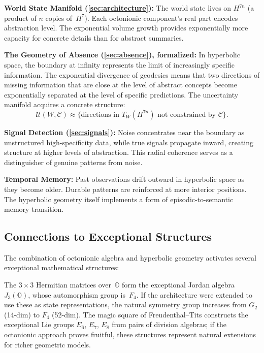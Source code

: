 \documentclass[11pt,a4paper]{article}
\newcommand{\Oct}{\mathbb{O}}
\begin{document}
\textbf{World State Manifold (\cref{sec:architecture}):} The world state lives on $H^{7n}$ (a product of $n$ copies of~$H^7$). Each octonionic component's real part encodes abstraction level. The exponential volume growth provides exponentially more capacity for concrete details than for abstract summaries.

\textbf{The Geometry of Absence (\cref{sec:absence}), formalized:} In hyperbolic space, the boundary at infinity represents the limit of increasingly specific information. The exponential divergence of geodesics means that two directions of missing information that are close at the level of abstract concepts become exponentially separated at the level of specific predictions. The uncertainty manifold acquires a concrete structure:
\begin{equation}
\mathcal{U}(W, \mathcal{C}) \approx \bigl\{ \text{directions in } T_W(H^{7n}) \text{ not constrained by } \mathcal{C} \bigr\}.
\end{equation}

\textbf{Signal Detection (\cref{sec:signals}):} Noise concentrates near the boundary as unstructured high-specificity data, while true signals propagate inward, creating structure at higher levels of abstraction. This radial coherence serves as a distinguisher of genuine patterns from noise.

\textbf{Temporal Memory:} Past observations drift outward in hyperbolic space as they become older. Durable patterns are reinforced at more interior positions. The hyperbolic geometry itself implements a form of episodic-to-semantic memory transition.

\subsection{Connections to Exceptional Structures}

The combination of octonionic algebra and hyperbolic geometry activates several exceptional mathematical structures:

The $3 \times 3$ Hermitian matrices over~$\Oct$ form the exceptional Jordan algebra $J_3(\Oct)$, whose automorphism group is~$F_4$. If the architecture were extended to use these as state representations, the natural symmetry group increases from $G_2$ (14-dim) to $F_4$ (52-dim). The magic square of Freudenthal--Tits constructs the exceptional Lie groups $E_6$, $E_7$, $E_8$ from pairs of division algebras; if the octonionic approach proves fruitful, these structures represent natural extensions for richer geometric models.
\end{document}
